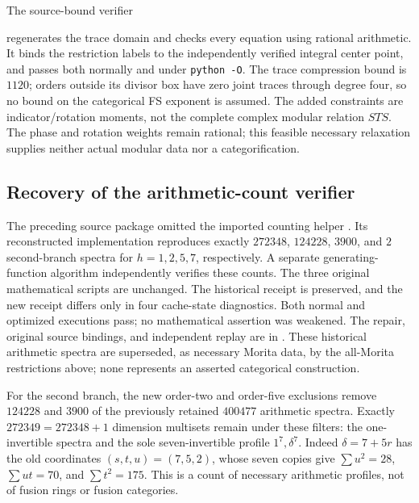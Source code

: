 The source-bound verifier
\begin{quote}\small{}\end{quote}
regenerates the trace domain and checks every equation using rational
arithmetic. It binds the restriction labels to the independently
verified integral center point, and passes both normally and under
\texttt{python -O}. The trace compression bound is $1120$; orders
outside its divisor box have zero joint traces through degree four,
so no bound on the categorical FS exponent is assumed.
The added constraints are indicator/rotation moments, not the complete
complex modular relation $STS$. The phase and rotation weights remain
rational; this feasible necessary relaxation supplies neither actual
modular data nor a categorification.

\subsection{Recovery of the arithmetic-count verifier}
The preceding source package omitted the imported counting helper
. Its reconstructed implementation reproduces
exactly $272348$, $124228$, $3900$, and $2$ second-branch spectra for
$h=1,2,5,7$, respectively. A separate generating-function algorithm
independently verifies these counts. The three original mathematical
scripts are unchanged. The historical receipt is preserved, and the new
receipt differs only in four cache-state diagnostics. Both normal and
optimized executions pass; no mathematical assertion was weakened.
The repair, original source bindings, and independent replay are in
.
These historical arithmetic spectra are superseded, as necessary Morita
data, by the all-Morita restrictions above; none represents an asserted
categorical construction.

For the second branch, the new order-two and order-five exclusions remove
$124228$ and $3900$ of the previously retained $400477$ arithmetic spectra.
Exactly $272349=272348+1$ dimension multisets remain under these filters:
the one-invertible spectra and the sole seven-invertible profile
$1^7,\delta^7$. Indeed $\delta=7+5r$ has the old coordinates
$(s,t,u)=(7,5,2)$, whose seven copies give
$\sum u^2=28$, $\sum ut=70$, and $\sum t^2=175$.
This is a count of necessary arithmetic profiles, not of fusion rings
or fusion categories.
